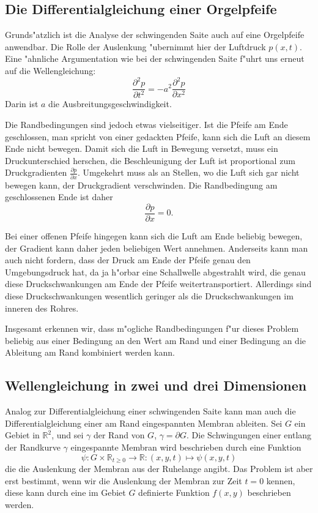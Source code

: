\subsection{Die Differentialgleichung einer Orgelpfeife\label{beispiele:orgelpfeife}}
Grunds"atzlich ist die Analyse der schwingenden Saite auch auf
eine Orgelpfeife anwendbar. Die Rolle der Auslenkung "ubernimmt
hier der Luftdruck $p(x,t)$. Eine "ahnliche Argumentation wie bei
der schwingenden Saite f"uhrt uns erneut auf die Wellengleichung:
\[
\frac{\partial^2p}{\partial t^2}=
-a^2\frac{\partial^2p}{\partial x^2}
\]
Darin ist $a$ die Ausbreitungsgeschwindigkeit.

Die Randbedingungen sind jedoch etwas vielseitiger.
Ist die Pfeife am Ende geschlossen, man spricht von
einer gedackten Pfeife, kann sich die Luft an diesem Ende nicht bewegen.
Damit sich die Luft in Bewegung versetzt, muss ein Druckunterschied herschen,
die Beschleunigung der Luft ist proportional zum Druckgradienten
$\frac{\partial p}{\partial x}$. Umgekehrt muss als an Stellen, wo die
Luft sich gar nicht bewegen kann, der Druckgradient verschwinden.
Die Randbedingung am geschlossenen Ende ist daher
\[
\frac{\partial p}{\partial x}=0.
\]

Bei einer offenen Pfeife hingegen kann sich die Luft am Ende beliebig
bewegen, der Gradient kann daher jeden beliebigen Wert annehmen.
Anderseits kann man auch nicht fordern, dass der Druck am
Ende der Pfeife genau den Umgebungsdruck hat, da ja h"orbar eine
Schallwelle abgestrahlt wird, die genau diese Druckschwankungen am
Ende der Pfeife weitertransportiert. Allerdings sind diese Druckschwankungen
wesentlich geringer als die Druckschwankungen im inneren des Rohres.

Insgesamt erkennen wir, dass m"ogliche Randbedingungen f"ur dieses Problem
beliebig aus einer Bedingung an den Wert am Rand und einer Bedingung
an die Ableitung am Rand kombiniert werden kann.

\subsection{Wellengleichung in zwei und drei Dimensionen\label{beispiele:wellengleichung2d}}
Analog zur Differentialgleichung einer schwingenden Saite kann
man auch die Differentialgleichung einer am Rand eingespannten Membran
ableiten.
Sei $G$ ein Gebiet in $\mathbb R^2$, und sei $\gamma$ der Rand
von $G$, $\gamma = \partial G$. Die Schwingungen einer entlang der Randkurve
$\gamma$ eingespannte Membran wird beschrieben durch eine Funktion
\[
\psi\colon G\times \mathbb R_{t \ge 0}\to\mathbb R\colon (x,y,t)\mapsto \psi(x,y,t)
\]
die die Auslenkung der Membran aus der Ruhelange angibt. Das Problem ist aber
erst bestimmt, wenn wir die Auslenkung der Membran zur Zeit $t=0$ kennen,
diese kann durch eine im Gebiet $G$ definierte Funktion $f(x,y)$ beschrieben
werden.

